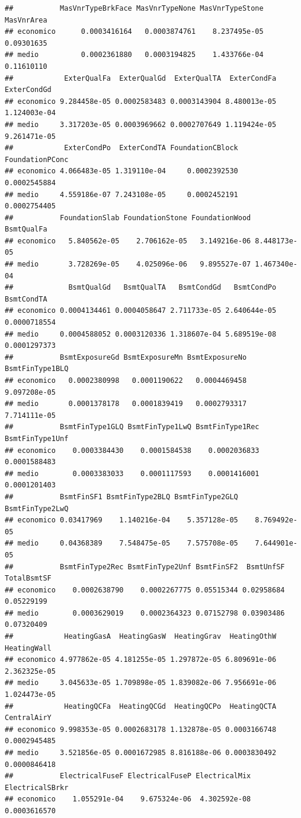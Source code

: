 \documentclass[
]{article}
\begin{document}
\begin{verbatim}
##           MasVnrTypeBrkFace MasVnrTypeNone MasVnrTypeStone MasVnrArea
## economico      0.0003416164   0.0003874761    8.237495e-05 0.09301635
## medio          0.0002361880   0.0003194825    1.433766e-04 0.11610110
##            ExterQualFa  ExterQualGd  ExterQualTA  ExterCondFa  ExterCondGd
## economico 9.284458e-05 0.0002583483 0.0003143904 8.480013e-05 1.124003e-04
## medio     3.317203e-05 0.0003969662 0.0002707649 1.119424e-05 9.261471e-05
##            ExterCondPo  ExterCondTA FoundationCBlock FoundationPConc
## economico 4.066483e-05 1.319110e-04     0.0002392530    0.0002545884
## medio     4.559186e-07 7.243108e-05     0.0002452191    0.0002754405
##           FoundationSlab FoundationStone FoundationWood   BsmtQualFa
## economico   5.840562e-05    2.706162e-05   3.149216e-06 8.448173e-05
## medio       3.728269e-05    4.025096e-06   9.895527e-07 1.467340e-04
##             BsmtQualGd   BsmtQualTA   BsmtCondGd   BsmtCondPo   BsmtCondTA
## economico 0.0004134461 0.0004058647 2.711733e-05 2.640644e-05 0.0000718554
## medio     0.0004588052 0.0003120336 1.318607e-04 5.689519e-08 0.0001297373
##           BsmtExposureGd BsmtExposureMn BsmtExposureNo BsmtFinType1BLQ
## economico   0.0002380998   0.0001190622   0.0004469458    9.097208e-05
## medio       0.0001378178   0.0001839419   0.0002793317    7.714111e-05
##           BsmtFinType1GLQ BsmtFinType1LwQ BsmtFinType1Rec BsmtFinType1Unf
## economico    0.0003384430    0.0001584538    0.0002036833    0.0001588483
## medio        0.0003383033    0.0001117593    0.0001416001    0.0001201403
##           BsmtFinSF1 BsmtFinType2BLQ BsmtFinType2GLQ BsmtFinType2LwQ
## economico 0.03417969    1.140216e-04    5.357128e-05    8.769492e-05
## medio     0.04368389    7.548475e-05    7.575708e-05    7.644901e-05
##           BsmtFinType2Rec BsmtFinType2Unf BsmtFinSF2  BsmtUnfSF TotalBsmtSF
## economico    0.0002638790    0.0002267775 0.05515344 0.02958684  0.05229199
## medio        0.0003629019    0.0002364323 0.07152798 0.03903486  0.07320409
##            HeatingGasA  HeatingGasW  HeatingGrav  HeatingOthW  HeatingWall
## economico 4.977862e-05 4.181255e-05 1.297872e-05 6.809691e-06 2.362325e-05
## medio     3.045633e-05 1.709898e-05 1.839082e-06 7.956691e-06 1.024473e-05
##            HeatingQCFa  HeatingQCGd  HeatingQCPo  HeatingQCTA  CentralAirY
## economico 9.998353e-05 0.0002683178 1.132878e-05 0.0003166748 0.0002945485
## medio     3.521856e-05 0.0001672985 8.816188e-06 0.0003830492 0.0000846418
##           ElectricalFuseF ElectricalFuseP ElectricalMix ElectricalSBrkr
## economico    1.055291e-04    9.675324e-06  4.302592e-08    0.0003616570

\end{verbatim}
\end{document}
